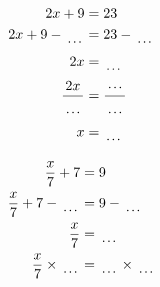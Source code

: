 \documentclass[12pt]{article}
\newcounter{minipagecount}
\begin{document}
\begin{multicols}{2}
\begin{minipage}[t]{0.45\textwidth}
    \raggedright %
    \begin{align*} %
        2x + 9 &= 23\\
        2x + 9 - \dotuline{\hspace{5mm}} &= 23 - \dotuline{\hspace{5mm}}\\
        2x &= \dotuline{\hspace{5mm}}\\
        \frac{2x}{\dotuline{\hspace{5mm}}} &= \frac{\dotuline{\hspace{5mm}}}{\dotuline{\hspace{5mm}}}\\
        x &= \dotuline{\hspace{5mm}}\\
    \end{align*}
\end{minipage} %
\noindent{(\theminipagecount)}\hspace{0.1mm} %
\begin{minipage}[t]{0.45\textwidth} %
    \vspace{-26pt}  %
    \raggedright %
    \begin{align*} %
        \frac{x}{7} + 7 &= 9\\
        \frac{x}{7} + 7 - \dotuline{\hspace{5mm}} &= 9 - \dotuline{\hspace{5mm}}\\
        \frac{x}{7} &= \dotuline{\hspace{5mm}}\\
        \frac{x}{7} \times\dotuline{\hspace{5mm}} &= \dotuline{\hspace{5mm}} \times\dotuline{\hspace{5mm}}\\

\end{align*}
\end{minipage}
\end{multicols}
\end{document}
